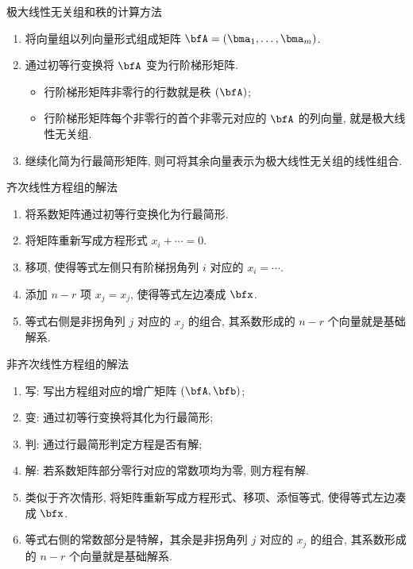 \documentclass[aspectratio=169,handout]{ctexbeamer}
\let\rank\relax\DeclareMathOperator\rank{\rank}
\begin{document}
\begin{frame}{极大线性无关组和秩的计算方法}
	\onslide<+->
	\begin{enumerate}
		\item 将向量组以列向量形式组成矩阵 $\bfA=(\bma_1,\dots,\bma_m)$.
		\item 通过初等行变换将 $\bfA$ 变为行阶梯形矩阵.
			\begin{itemize}
				\item 行阶梯形矩阵非零行的行数就是秩 $\rank(\bfA)$;
				\item 行阶梯形矩阵每个非零行的首个非零元对应的 $\bfA$ 的列向量, 就是极大线性无关组.
			\end{itemize}
		\item 继续化简为行最简形矩阵, 则可将其余向量表示为极大线性无关组的线性组合.
	\end{enumerate}
\end{frame}



\begin{frame}{齐次线性方程组的解法}
	\onslide<+->
	\begin{enumerate}
		\item 将系数矩阵通过初等行变换化为行最简形.
		\item 将矩阵重新写成方程形式 $x_i+\cdots=0$.
		\item 移项, 使得等式左侧只有阶梯拐角列 $i$ 对应的 $x_i=\cdots$.
		\item 添加 $n-r$ 项 $x_j=x_j$, 使得等式左边凑成 $\bfx$.
		\item 等式右侧是非拐角列 $j$ 对应的 $x_j$ 的组合, 其系数形成的 $n-r$ 个向量就是基础解系.
	\end{enumerate}
\end{frame}



\begin{frame}{非齐次线性方程组的解法}
	\onslide<+->
	\begin{enumerate}
		\item 写: 写出方程组对应的增广矩阵 $(\bfA,\bfb)$;
		\item 变: 通过初等行变换将其化为行最简形;
		\item 判: 通过行最简形判定方程是否有解;
		\item 解: 若系数矩阵部分零行对应的常数项均为零, 则方程有解.
		\item 类似于齐次情形, 将矩阵重新写成方程形式、移项、添恒等式, 使得等式左边凑成 $\bfx$.
		\item 等式右侧的常数部分是特解，其余是非拐角列 $j$ 对应的 $x_j$ 的组合, 其系数形成的 $n-r$ 个向量就是基础解系.
	\end{enumerate}
\end{frame}
\end{document}
